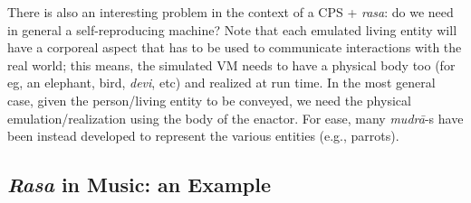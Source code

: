 There is also an interesting problem in the context of a CPS + \textsl{rasa}: do we need in general a self-reproducing machine? Note that each emulated living entity will have a corporeal aspect that has to be used to communicate interactions with the real world; this means, the simulated VM needs to have a physical body too (for eg, an elephant, bird, \textsl{devi}, etc) and realized at run time. In the most general case, given the person/living entity to be conveyed, we need the physical emulation/realization using the body of the enactor. For ease, many \textsl{mudrā}-s have been instead developed to represent the various entities (e.g., parrots).\\[-20pt]

\subsection{\textsl{Rasa} in Music: an Example}\label{chap3-sec4.3}

